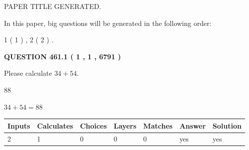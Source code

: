 \documentclass[12pt]{article}
\begin{document}
   
   
   
   
   
 \vspace{0.2in}
 
 
 
 
   
   
 PAPER TITLE GENERATED.
   
   
   
\vspace{0.2in}
   
In this paper, big questions will be generated in the following order: 
   
   
   1 ( 1 )
 ,
   2 ( 2 )
 .
  
\vspace{0.2in}
  
{\textbf{\Large{QUESTION
461.1 
 ( 1 , 1 , 6791 )
}}}
  
  
 
Please calculate $ %
34 +  %
54 $.
 
 
 
\noindent{}
 
 

88
 
 
\noindent{}
 
 

 
 
 
\noindent{}
 
 

$ %
34 +  %
54=   %
88$
 
 
\noindent{}
 
 

 
   
   
   
   
\noindent\begin{tabular}{|l|l|l|l|l|l|l|}
 \hline
Inputs & Calculates & Choices & Layers & Matches & Answer & Solution \\ \hline
 2  & 
 1  & 
 0
  & 
 0  & 
 0  & 
  yes & 
  yes 
  \\ \hline
 \end{tabular}
   
   
   
   
\noindent{}
   
\end{document}
